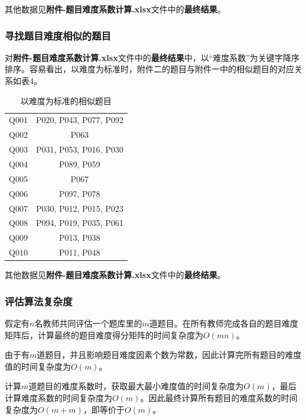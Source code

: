 其他数据见\textbf{附件-题目难度系数计算.xlsx}文件中的\textbf{最终结果}。

\subsubsection{寻找题目难度相似的题目}

对\textbf{附件-题目难度系数计算.xlsx}文件中的\textbf{最终结果}中，以“难度系数”为关键字降序排序。容易看出，以难度为标准时，附件二的题目与附件一中的相似题目的对应关系如表4。

\begin{table}[htbp]
    \centering
    \label{tablesmr}
    \caption{以难度为标准的相似题目}
    \begin{tabular}{@{}cc@{}}
    \toprule
    \quad\quad\quad\quad{}\quad\quad\quad\quad\quad & \quad\quad\quad\quad{}\quad\quad\quad\quad\quad\\ \midrule
    Q001 & P020, P043, P077, P092 \\
    Q002 & P063 \\
    Q003 & P031, P053, P016, P030 \\
    Q004 & P089, P059 \\
    Q005 & P067 \\
    Q006 & P097, P078 \\
    Q007 & P030, P012, P015, P023 \\
    Q008 & P094, P019, P035, P061 \\
    Q009 & P013, P038 \\
    Q010 & P011, P048 \\ \bottomrule
    \end{tabular}
\end{table}

其他数据见\textbf{附件-题目难度系数计算.xlsx}文件中的\textbf{最终结果}。

\subsubsection{评估算法复杂度}

假定有$n$名教师共同评估一个题库里的$m$道题目。在所有教师完成各自的题目难度矩阵后，计算最终的题目难度得分矩阵的时间复杂度为$O(mn)$。

由于有$m$道题目，并且影响题目难度因素个数为常数，因此计算完所有题目的难度值的时间复杂度为$O(m)$。

计算$m$道题目的难度系数时，获取最大最小难度值的时间复杂度为$O(m)$，最后计算难度系数的时间复杂度为$O(m)$。因此最终计算所有题目的难度系数的时间复杂度为$O(m + m)$，即等价于$O(m)$。

